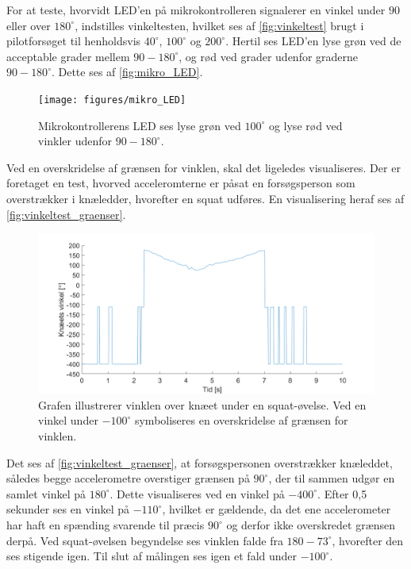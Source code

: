 For at teste, hvorvidt LED'en på mikrokontrolleren signalerer en vinkel under $90$ eller over $180^{\circ}$, indstilles vinkeltesten, hvilket ses af \autoref{fig:vinkeltest} brugt i pilotforsøget til henholdsvis $40^{\circ}$, $100^{\circ}$ og $200^{\circ}$. Hertil ses LED'en lyse grøn ved de acceptable grader mellem $90-180^{\circ}$, og rød ved grader udenfor graderne $90-180^{\circ}$. Dette ses af \autoref{fig:mikro_LED}.

\begin{figure}[H]
\centering
\texttt{[image: figures/mikro\_LED]}
\caption{Mikrokontrollerens LED ses lyse grøn ved $100^{\circ}$ og lyse rød ved vinkler udenfor $90-180^{\circ}$.}
\label{fig:mikro_LED}
\end{figure}

Ved en overskridelse af grænsen for vinklen, skal det ligeledes visualiseres. Der er foretaget en test, hvorved acceleromterne er påsat en forsøgsperson som overstrækker i knæledder, hvorefter en squat udføres. En visualisering heraf ses af \autoref{fig:vinkeltest_graenser}.

\begin{figure}[H]
\centering
\includegraphics[width=1\textwidth]{figures/vinkeltest_graenser}
\caption{Grafen illustrerer vinklen over knæet under en squat-øvelse. Ved en vinkel under $-100^{\circ}$ symboliseres en overskridelse af grænsen for vinklen. }
\label{fig:vinkeltest_graenser}
\end{figure}

Det ses af \autoref{fig:vinkeltest_graenser}, at forsøgspersonen overstrækker knæleddet, således begge accelerometre overstiger grænsen på $90^{\circ}$, der til sammen udgør en samlet vinkel på $180^{\circ}$. Dette visualiseres ved en vinkel på $-400^{\circ}$. 
Efter 0,5 sekunder ses en vinkel på $-110^{\circ}$, hvilket er gældende, da det ene accelerometer har haft en spænding svarende til præcis $90^{\circ}$ og derfor ikke overskredet grænsen derpå. Ved squat-øvelsen begyndelse ses vinklen falde fra $180-73^{\circ}$, hvorefter den ses stigende igen. Til slut af målingen ses igen et fald under $-100^{\circ}$.

